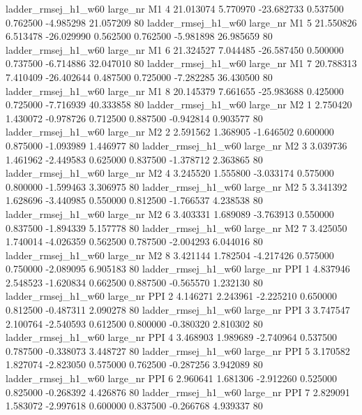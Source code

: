 ladder_rmsej_h1_w60   large_nr       M1                 4 21.013074  5.770970 -23.682733 0.537500 0.762500 -4.985298   21.057209 80
ladder_rmsej_h1_w60   large_nr       M1                 5 21.550826  6.513478 -26.029990 0.562500 0.762500 -5.981898   26.985659 80
ladder_rmsej_h1_w60   large_nr       M1                 6 21.324527  7.044485 -26.587450 0.500000 0.737500 -6.714886   32.047010 80
ladder_rmsej_h1_w60   large_nr       M1                 7 20.788313  7.410409 -26.402644 0.487500 0.725000 -7.282285   36.430500 80
ladder_rmsej_h1_w60   large_nr       M1                 8 20.145379  7.661655 -25.983688 0.425000 0.725000 -7.716939   40.333858 80
ladder_rmsej_h1_w60   large_nr       M2                 1  2.750420  1.430072  -0.978726 0.712500 0.887500 -0.942814    0.903577 80
ladder_rmsej_h1_w60   large_nr       M2                 2  2.591562  1.368905  -1.646502 0.600000 0.875000 -1.093989    1.446977 80
ladder_rmsej_h1_w60   large_nr       M2                 3  3.039736  1.461962  -2.449583 0.625000 0.837500 -1.378712    2.363865 80
ladder_rmsej_h1_w60   large_nr       M2                 4  3.245520  1.555800  -3.033174 0.575000 0.800000 -1.599463    3.306975 80
ladder_rmsej_h1_w60   large_nr       M2                 5  3.341392  1.628696  -3.440985 0.550000 0.812500 -1.766537    4.238538 80
ladder_rmsej_h1_w60   large_nr       M2                 6  3.403331  1.689089  -3.763913 0.550000 0.837500 -1.894339    5.157778 80
ladder_rmsej_h1_w60   large_nr       M2                 7  3.425050  1.740014  -4.026359 0.562500 0.787500 -2.004293    6.044016 80
ladder_rmsej_h1_w60   large_nr       M2                 8  3.421144  1.782504  -4.217426 0.575000 0.750000 -2.089095    6.905183 80
ladder_rmsej_h1_w60   large_nr      PPI                 1  4.837946  2.548523  -1.620834 0.662500 0.887500 -0.565570    1.232130 80
ladder_rmsej_h1_w60   large_nr      PPI                 2  4.146271  2.243961  -2.225210 0.650000 0.812500 -0.487311    2.090278 80
ladder_rmsej_h1_w60   large_nr      PPI                 3  3.747547  2.100764  -2.540593 0.612500 0.800000 -0.380320    2.810302 80
ladder_rmsej_h1_w60   large_nr      PPI                 4  3.468903  1.989689  -2.740964 0.537500 0.787500 -0.338073    3.448727 80
ladder_rmsej_h1_w60   large_nr      PPI                 5  3.170582  1.827074  -2.823050 0.575000 0.762500 -0.287256    3.942089 80
ladder_rmsej_h1_w60   large_nr      PPI                 6  2.960641  1.681306  -2.912260 0.525000 0.825000 -0.268392    4.426876 80
ladder_rmsej_h1_w60   large_nr      PPI                 7  2.829091  1.583072  -2.997618 0.600000 0.837500 -0.266768    4.939337 80
